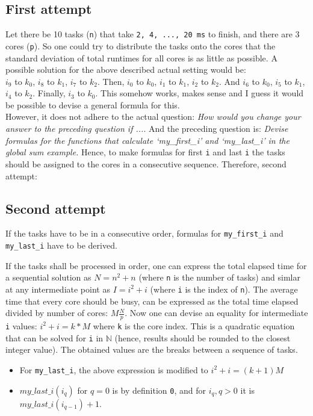 \documentclass[a4paper,11pt,twoside]{article}
\begin{document}
\subsection{First attempt}
Let there be 10 tasks (\verb+n+) that take \verb+2, 4, ..., 20 ms+ to finish, and there are 3 cores (\verb+p+). So one could try to distribute the tasks onto the cores that the standard deviation of total runtimes for all cores is as little as possible. A possible solution for the above described actual setting would be:\\ $i_{9}$ to $k_{0}$, $i_{8}$ to $k_{1}$, $i_{7}$ to $k_{2}$. Then,  $i_{0}$ to $k_{0}$, $i_{1}$ to $k_{1}$, $i_{2}$ to $k_{2}$. And $i_{6}$ to $k_{0}$, $i_{5}$ to $k_{1}$, $i_{4}$ to $k_{2}$. Finally, $i_{3}$ to $k_{0}$. This somehow works, makes sense and I guess it would be possible to devise a general formula for this.\\
However, it does not adhere to the actual question: \textit{How would you change your answer to the preceding question if ...}. And the preceding question is: \textit{Devise formulas for the functions that calculate `my\_first\_i' and `my\_last\_i' in the global sum example.} Hence, to make formulas for first \verb+i+ and last \verb+i+ the tasks should be assigned to the cores in a consecutive sequence. Therefore, second attempt:

\subsection{Second attempt}
If the tasks have to be in a consecutive order, formulas for \verb+my_first_i+ and \verb+my_last_i+ have to be derived.

If the tasks shall be processed in order, one can express the total elapsed time for a sequential solution as $N = n^{2} + n$ (where \verb+n+ is the number of tasks) and simlar at any intermediate point as $I = i^{2} + i$ (where \verb+i+ is the index of \verb+n+). The average time that every core should be busy, can be expressed as the total time elapsed divided by number of cores: $M\frac{N}{p}$. Now one can devise an equality for intermediate \verb+i+ values: $i^{2}+i = k*M$ where \verb+k+ is the core index. This is a quadratic equation that can be solved for \verb+i+ in $\mathbb{N}$ (hence, results should be rounded to the closest integer value). The obtained values are the breaks between a sequence of tasks. 
\begin{itemize}
\item For \verb+my_last_i+, the above expression is modified to  $i^{2}+i=(k + 1)M$
\item $my\_last\_i(i_{q})$ for $q=0$ is by definition \verb+0+, and for $i_{q}, q > 0$ it is $my\_last\_i(i_{q-1}) + 1$. 
\end{itemize}
 
\end{document}
